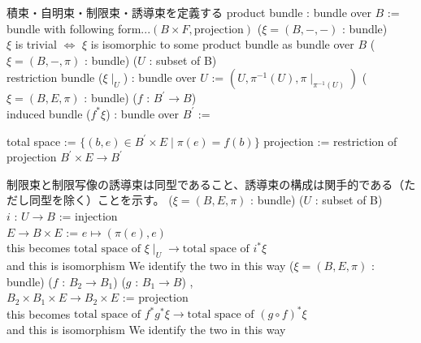 \begin{Definition}
\itemnote
  積束・自明束・制限束・誘導束を定義する
\itemdefi 
  \Define product bundle : bundle over \(B\) := bundle with following form...\((B \times F , \text{projection})\)
\itemdefi
  \For (\(\xi = (B , - , -)\) : bundle) \\
  \Define \(\xi\) is trivial \(\iff\) \(\xi\) is isomorphic to some product bundle as bundle over \(B\)
\itemdefi
  \For (\(\xi = (B , - , \pi)\) : bundle) (\(U\) : subset of B) \\
  \Define restriction bundle (\(\xi \mid_{U}\)) : bundle over \(U\) := \((U , \pi^{-1}(U) , \pi \mid_{\pi^{-1}(U)})\)
\itemdefi
  \For (\(\xi = (B , E , \pi)\) : bundle) (\(f\) : \(B^{\prime} \to B\)) \\
  \Define induced bundle (\(f^*\xi\)) : bundle over \(B^{\prime}\) :=
  \begin{itemize}
    \itemenum total space := \(\{(b , e) \in B^{\prime} \times E \mid \pi(e) = f(b)\}\)
    \itemenum projection := restriction of projection \(B^{\prime} \times E \to B^{\prime}\)
  \end{itemize}
\end{Definition}

\begin{Theorem}
\itemnote
  制限束と制限写像の誘導束は同型であること、誘導束の構成は関手的である（ただし同型を除く）ことを示す。
\itemprop
  \For (\(\xi = (B , E ,\pi)\) : bundle) (\(U\) : subset of B) \\
  \Let \(i\) : \(U \to B\) := injection \\
  \Let \(E \to B \times E\) := \(e \mapsto (\pi(e) , e)\) \\
  \Then this becomes \(\text{total space of } \xi \mid_{U} \to \text{total space of } i^*\xi\) \\
  and this is isomorphism
\itemnote
  We identify the two in this way
\itemprop
  \For (\(\xi = (B , E , \pi)\) : bundle) (\(f\) : \(B_2 \to B_1\)) (\(g\) : \(B_1 \to B\)) ,\\
  \Let \(B_2 \times B_1 \times E \to B_2 \times E\) := projection \\
  \Then this becomes \(\text{total space of } f^*g^* \xi \to \text{total space of } (g \circ f)^* \xi\) \\
  and this is isomorphism
\itemnote
  We identify the two in this way 
\end{Theorem}

